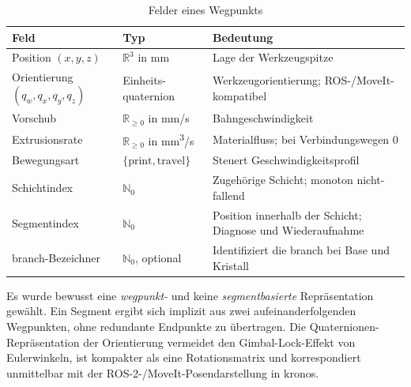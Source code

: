                 \begin{table}[ht]
                    \centering
                    \caption[Felder eines Wegpunkts]{Felder eines Wegpunkts}
                    \label{tab:interface-waypoint-fields}
                    \begin{tabular}{@{} l l p{6.0cm} @{}}
                        \toprule
                        \textbf{Feld} & \textbf{Typ} & \textbf{Bedeutung} \\
                        \midrule
                        Position $(x, y, z)$                 & $\mathbb{R}^3$ in \si{mm}            & Lage der Werkzeugspitze \\
                        Orientierung $(q_w, q_x, q_y, q_z)$  & Einheits-\gls{quaternion}            & Werkzeugorientierung; ROS-/MoveIt-kompatibel \\
                        Vorschub                             & $\mathbb{R}_{\geq 0}$ in \si{mm/s}   & Bahngeschwindigkeit \\
                        Extrusionsrate                       & $\mathbb{R}_{\geq 0}$ in \si{mm^3/s} & Materialfluss; bei Verbindungswegen $0$ \\
                        Bewegungsart                         & $\{\text{print}, \text{travel}\}$    & Steuert Geschwindigkeitsprofil \\
                        Schichtindex                         & $\mathbb{N}_0$                       & Zugehörige Schicht; monoton nicht-fallend \\
                        Segmentindex                         & $\mathbb{N}_0$                       & Position innerhalb der Schicht; Diagnose und Wiederaufnahme \\
                        \Gls{branch}-Bezeichner              & $\mathbb{N}_0$, optional             & Identifiziert die \gls{branch} bei Base und Kristall \\
                        \bottomrule
                    \end{tabular}
                \end{table}

                Es wurde bewusst eine \emph{wegpunkt-} und keine \emph{segmentbasierte} Repräsentation gewählt.
                Ein Segment ergibt sich implizit aus zwei aufeinanderfolgenden Wegpunkten, ohne redundante Endpunkte zu übertragen.
                Die Quaternionen-Repräsentation der Orientierung vermeidet den Gimbal-Lock-Effekt von Eulerwinkeln, ist kompakter als eine Rotationsmatrix und korrespondiert unmittelbar mit der ROS-2-/MoveIt-Posendarstellung in \ac{kronos}.

